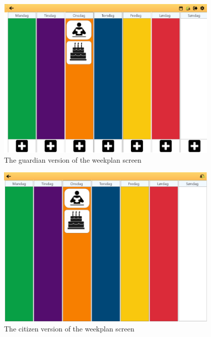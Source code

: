 \begin{figure}[H]
    \begin{center}
        \includegraphics[width=0.95\textwidth]{figures/Prototypes/WeekPlannerGuardianPrototype.png}
    \end{center}
    \caption{The guardian version of the weekplan screen}
    \label{fig:WeekplanGuarProt}
\end{figure}

\begin{figure}[H]
    \begin{center}
        \includegraphics[width=0.95\textwidth]{figures/Prototypes/WeekPlannerCitizenPrototype.png}
    \end{center}
    \caption{The citizen version of the weekplan screen}
    \label{fig:WeekplanCitProt}
\end{figure}

